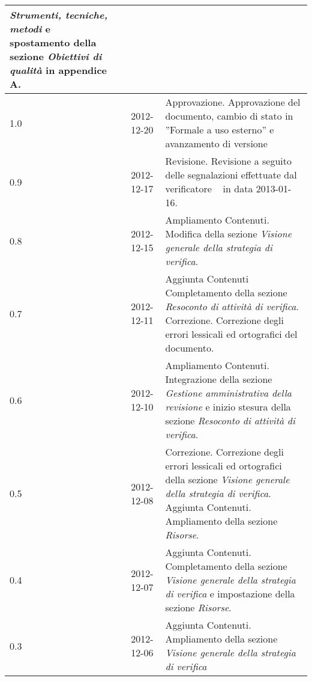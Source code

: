 \begin{longtable}{p{} p{} p{} p{}}
												\emph{Strumenti, tecniche, metodi} e spostamento della sezione \emph{Obiettivi di qualit\`a} 
												in appendice A.\\
	    \midrule
		    1.0		&	\VP	&	2012-12-20			&	Approvazione.\newline
												Approvazione del documento, cambio di stato in ”Formale a uso esterno” e avanzamento di versione\\
	    \midrule
		    0.9		&	\FZ	&	2012-12-17			&	Revisione.\newline
												Revisione a seguito delle segnalazioni effettuate dal verificatore \DC~ in data 2013-01-16.\\
	    \midrule
		    0.8		&	\AB	&	2012-12-15			&	Ampliamento Contenuti.\newline
												Modifica della sezione \emph{Visione generale della strategia di verifica}.\\
	    \midrule	
		    0.7		&	\AB	&	2012-12-11			&	Aggiunta Contenuti\newline
												Completamento della sezione \emph{Resoconto di attivit\`a di verifica}.\newline 
												Correzione.\newline
												Correzione degli errori lessicali ed ortografici del documento.\\
	    \midrule
		    0.6		&	\FZ	&	2012-12-10			&	Ampliamento Contenuti.\newline
												Integrazione della sezione \emph{Gestione amministrativa della revisione} e inizio stesura 
												della sezione \emph{Resoconto di attivit\`a di verifica}.\\
	    \midrule
		    0.5		&	\FZ	&	2012-12-08			&	Correzione.\newline
												Correzione degli errori lessicali ed ortografici della sezione \emph{Visione generale della strategia di verifica}.\newline
												Aggiunta Contenuti.\newline
												Ampliamento della sezione \emph{Risorse}.\\
	    \midrule
		    0.4		&	\AB	&	2012-12-07			&	Aggiunta Contenuti.\newline
												Completamento della sezione \emph{Visione generale della strategia di verifica}  
												e impostazione della sezione \emph{Risorse}.\\
	    \midrule
		    0.3		&	\FZ	&	2012-12-06			&	Aggiunta Contenuti.\newline 
												Ampliamento della sezione \emph{Visione generale della strategia di verifica} 

\end{longtable}

